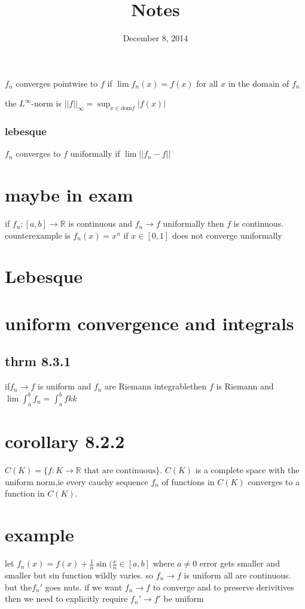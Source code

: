 \documentclass[letterpaper]{article}
\begin{document}
\title{Notes}
\date{December 8, 2014}
\maketitle
$f_n$ converges pointwise to $f$ if $\lim f_n(x)=f(x)$ for all $x$ in the domain of $f_n$

the $L^\infty$-norm is $||f||_\infty=\sup_{x\in\text{dom} f}|f(x)|$

\subsubsection*{lebesque}
$f_n$ converges to $f$ uniformally if $\lim||f_n-f||$

\section*{maybe in exam}
if $f_n:[a,b]\to\mathbb{R}$ is continuous and $f_n\to f$ uniformally then $f$ is continuous. counterexample is $f_n(x)=x^n$ if $x\in[0,1]$ does not converge uniformally

\section*{Lebesque}

\section*{uniform convergence and integrals}
\subsection*{thrm 8.3.1}
if$f_n\to f$ is uniform and $f_n$ are Riemann integrablethen $f$ is Riemann and $\lim\int_a^b{f_n}=\int_a^b{fkk}$

\section*{corollary 8.2.2}
$C(K)=\{f:K\to  \mathbb{R}\text{ that are continuous}\}$. $C(K)$ is a complete space with the uniform norm,ie every cauchy sequence $f_n$ of functions in $C(K)$ converges to a function in $C(K)$. 

\section*{example}
let $f_n(x)=f(x)+\frac{1}{n}\sin(\frac{x}{n}\in[a,b]$ where $a\ne 0$ error gets smaller and smaller but sin function wildly varies. so $f_n\to f$ is uniform all are continuous. but the$f_n'$ goes nuts. if we want $f_n\to f$ to converge and to preserve derivitives then we need to explicitly require $f_n'\to f'$ be uniform
\end{document}

